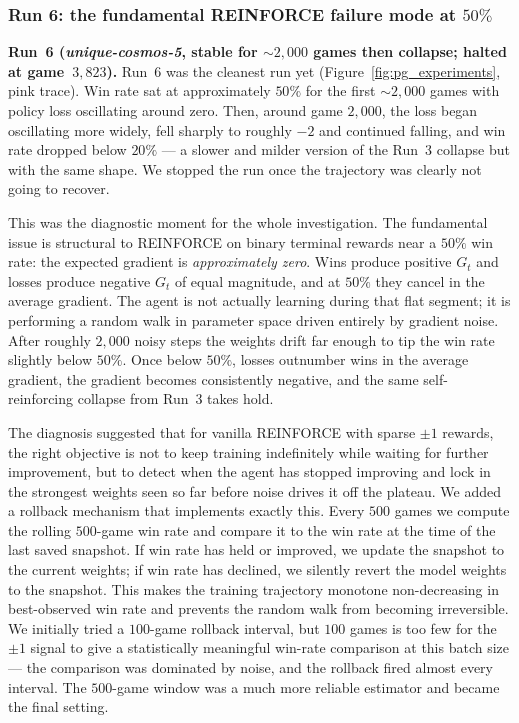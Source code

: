 \documentclass[11pt]{article}
\begin{document}
\subsubsection{Run 6: the fundamental REINFORCE failure mode at $50\%$}
\label{sssec:pg_run6}

\textbf{Run~6 (\emph{unique-cosmos-5}, stable for $\sim\!2{,}000$
games then collapse; halted at game~$3{,}823$).} Run~6 was the
cleanest run yet (Figure~\ref{fig:pg_experiments}, pink trace). Win
rate sat at approximately $50\%$ for the first $\sim\!2{,}000$ games
with policy loss oscillating around zero. Then, around game
$2{,}000$, the loss began oscillating more widely, fell sharply to
roughly $-2$ and continued falling, and win rate dropped below
$20\%$ --- a slower and milder version of the Run~3 collapse but with
the same shape. We stopped the run once the trajectory was clearly
not going to recover.

This was the diagnostic moment for the whole investigation. The
fundamental issue is structural to REINFORCE on binary terminal
rewards near a $50\%$ win rate: the expected gradient is
\emph{approximately zero}. Wins produce positive $G_t$ and losses
produce negative $G_t$ of equal magnitude, and at $50\%$ they cancel
in the average gradient. The agent is not actually learning during
that flat segment; it is performing a random walk in parameter space
driven entirely by gradient noise. After roughly $2{,}000$ noisy
steps the weights drift far enough to tip the win rate slightly
below $50\%$. Once below $50\%$, losses outnumber wins in the average
gradient, the gradient becomes consistently negative, and the same
self-reinforcing collapse from Run~3 takes hold.

The diagnosis suggested that for vanilla REINFORCE with sparse
$\pm 1$ rewards, the right objective is not to keep training
indefinitely while waiting for further improvement, but to detect
when the agent has stopped improving and lock in the strongest weights
seen so far before noise drives it off the plateau. We added a
rollback mechanism that implements exactly this. Every $500$ games we
compute the rolling $500$-game win rate and compare it to the win
rate at the time of the last saved snapshot. If win rate has held or
improved, we update the snapshot to the current weights; if win rate
has declined, we silently revert the model weights to the snapshot.
This makes the training trajectory monotone non-decreasing in
best-observed win rate and prevents the random walk from becoming
irreversible. We initially tried a $100$-game rollback interval, but
$100$ games is too few for the $\pm 1$ signal to give a statistically
meaningful win-rate comparison at this batch size --- the comparison
was dominated by noise, and the rollback fired almost every interval.
The $500$-game window was a much more reliable estimator and became
the final setting.
\end{document}
